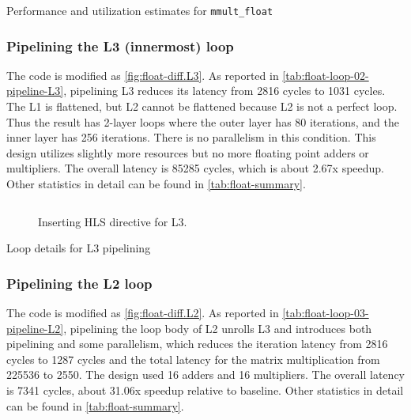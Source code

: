 \begin{table}
    \centering
    \caption{Performance and utilization estimates for \texttt{mmult\_float}}\label{tab:float-summary}
    
\end{table}

\subsubsection{Pipelining the L3 (innermost) loop}\label{sec:1bL3}

The code is modified as \autoref{fig:float-diff.L3}.
As reported in \autoref{tab:float-loop-02-pipeline-L3}, pipelining L3 reduces its latency from 2816 cycles to 1031 cycles.
The L1 is flattened, but L2 cannot be flattened because L2 is not a perfect loop.
Thus the result has 2-layer loops where the outer layer has 80 iterations, and the inner layer has 256 iterations.
There is no parallelism in this condition.
This design utilizes slightly more resources but no more floating point adders or multipliers.
The overall latency is 85285 cycles, which is about 2.67x speedup.
Other statistics in detail can be found in \autoref{tab:float-summary}.

\begin{figure}[h!]
    \centering
    \inputminted{diff}{program/diff.L3}
    \caption{Inserting HLS directive for L3.}\label{fig:float-diff.L3}
\end{figure}

\begin{table}[h!]
    \caption{Loop details for L3 pipelining}
    \label{tab:float-loop-02-pipeline-L3}
    \centering
    
\end{table}

\subsubsection{Pipelining the L2 loop}\label{sec:1bL2}

The code is modified as \autoref{fig:float-diff.L2}.
As reported in \autoref{tab:float-loop-03-pipeline-L2}, pipelining the loop body of L2 unrolls L3 and introduces both pipelining and some parallelism, which reduces the iteration latency from 2816 cycles to 1287 cycles and the total latency for the matrix multiplication from 225536 to 2550.
The design used 16 adders and 16 multipliers.
The overall latency is 7341 cycles, about 31.06x speedup relative to baseline.
Other statistics in detail can be found in \autoref{tab:float-summary}.


